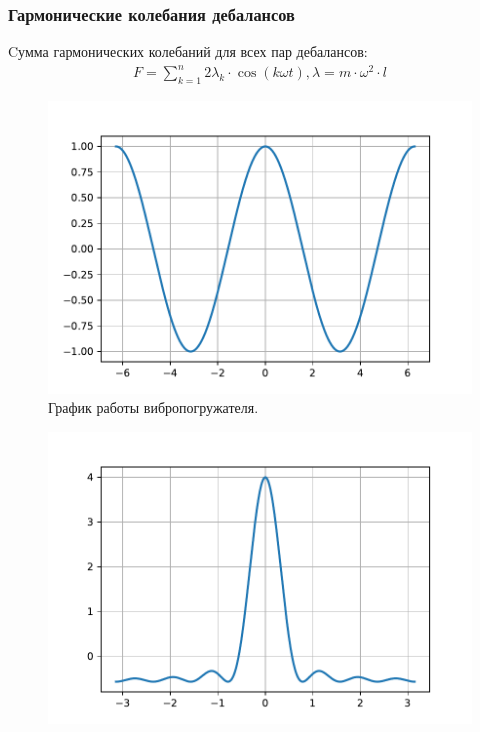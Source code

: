 \documentclass[10pt, pdf, hyperref={unicode}]{beamer}
\begin{document}
    \begin{frame}
        \frametitle{Гармонические колебания дебалансов}
        \begin{center}
            \begin{minipage}[h]{0.97\linewidth}
                Cумма гармонических колебаний для всех пар дебалансов:
                \begin{equation}\label{eq:harmonic_sum}
                    \begin{gathered}
                        F = \sum\limits_{k = 1}^n 2 \lambda_k \cdot \cos (k \omega t), \lambda = m \cdot \omega^2 \cdot l
                    \end{gathered}
                \end{equation}
                \begin{minipage}[h]{0.46\linewidth}
                    \begin{figure}[h]
                        \centering
                        \includegraphics[width=1\linewidth]{../grap/impulse_1.pdf}
                        \caption{График работы вибропогружателя.}
                    \end{figure}
                \end{minipage}
                \hfill
                \begin{minipage}[h]{0.46\linewidth}
                    \begin{figure}[h]
                        \centering
                        \includegraphics[width=1\linewidth]{../grap/impulse_7.pdf}

\end{figure}
\end{minipage}
\end{minipage}
\end{center}
\end{frame}
\end{document}
